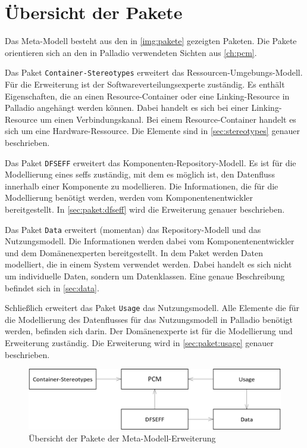 \section{Übersicht der Pakete}
\label{sec:metabildung}
Das Meta-Modell besteht aus den in \autoref{img:pakete} gezeigten Paketen. Die Pakete orientieren sich an den in Palladio verwendeten Sichten aus \autoref{ch:pcm}. \par
Das Paket \texttt{Container-Stereotypes} erweitert das Ressourcen-Umgebungs-Modell. Für die Erweiterung ist der Softwareverteilungsexperte zuständig. Es enthält Eigenschaften, die an einen Resource-Container oder eine Linking-Resource in Palladio angehängt werden können. Dabei handelt es sich bei einer Linking-Resource um einen Verbindungskanal. Bei einem Resource-Container handelt es sich um eine Hardware-Ressource. Die Elemente sind in \autoref{sec:stereotypes} genauer beschrieben. \par
Das Paket \texttt{DFSEFF} erweitert das Komponenten-Repository-Modell. Es ist für die Modellierung eines \gls{seff}s zuständig, mit dem es möglich ist, den Datenfluss innerhalb einer Komponente zu modellieren. Die Informationen, die für die Modellierung benötigt werden, werden vom Komponentenentwickler bereitgestellt. In \autoref{sec:paket:dfseff} wird die Erweiterung genauer beschrieben. \par
Das Paket \texttt{Data} erweitert (momentan) das Repository-Modell und das Nutzungsmodell. Die Informationen werden dabei vom Komponentenentwickler und dem Domänenexperten bereitgestellt. In dem Paket werden Daten modelliert, die in einem System verwendet werden. Dabei handelt es sich nicht um individuelle Daten, sondern um Datenklassen. Eine genaue Beschreibung befindet sich in \autoref{sec:data}. \par
Schließlich erweitert das Paket \texttt{Usage} das Nutzungsmodell. Alle Elemente die für die Modellierung des Datenflusses für das Nutzungsmodell in Palladio benötigt werden, befinden sich darin. Der Domänenexperte ist für die Modellierung und Erweiterung zuständig. Die Erweiterung wird in \autoref{sec:paket:usage} genauer beschrieben. \par

\begin{figure}[htp]
	\centering
  	\includegraphics[width=1\textwidth]{images/pakete.png}
	\caption{Übersicht der Pakete der Meta-Modell-Erweiterung}
	\label{img:pakete}
\end{figure}

